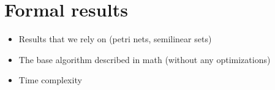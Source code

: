 \section{Formal results}
\label{sec:formal-results}

\begin{itemize}
	\item Results that we rely on (petri nets, semilinear sets)
	\item The base algorithm described in math (without any optimizations)
	\item Time complexity
\end{itemize}